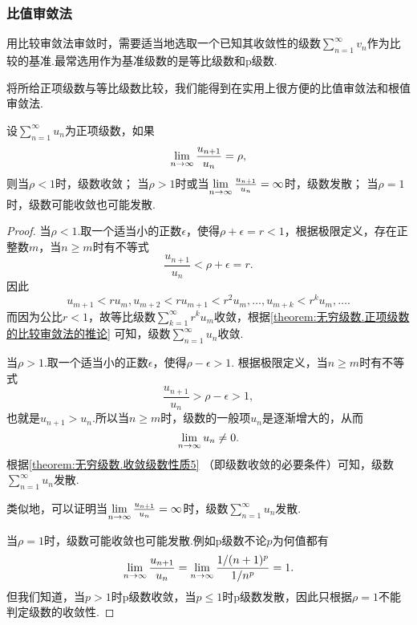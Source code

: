 \subsubsection{比值审敛法}
用比较审敛法审敛时，需要适当地选取一个已知其收敛性的级数\(\sum\limits_{n=1}^\infty v_n\)作为比较的基准.最常选用作为基准级数的是等比级数和p级数.

将所给正项级数与等比级数比较，我们能得到在实用上很方便的比值审敛法和根值审敛法.
\begin{theorem}\label{theorem:无穷级数.正项级数的比值审敛法}
设\(\sum\limits_{n=1}^\infty u_n\)为正项级数，如果\[
\lim\limits_{n\to\infty} \frac{u_{n+1}}{u_n}=\rho,
\]则当\(\rho<1\)时，级数收敛；
当\(\rho>1\)时或当\(\lim\limits_{n\to\infty} \frac{u_{n+1}}{u_n}=\infty\)时，级数发散；
当\(\rho=1\)时，级数可能收敛也可能发散.
\begin{proof}
当\(\rho<1\).取一个适当小的正数\(\epsilon\)，使得\(\rho+\epsilon=r<1\)，根据极限定义，存在正整数\(m\)，当\(n \geq m\)时有不等式\[
\frac{u_{n+1}}{u_n} < \rho + \epsilon = r.
\]因此\[
u_{m+1} < r u_m,
u_{m+2} < r u_{m+1} < r^2 u_m,
\dotsc,
u_{m+k} < r^k u_m,
\dotsc.
\]而因为公比\(r<1\)，故等比级数\(\sum\limits_{k=1}^\infty r^k u_m\)收敛，根据\cref{theorem:无穷级数.正项级数的比较审敛法的推论} 可知，级数\(\sum\limits_{n=1}^\infty u_n\)收敛.

当\(\rho>1\).取一个适当小的正数\(\epsilon\)，使得\(\rho-\epsilon>1\).
根据极限定义，当\(n \geq m\)时有不等式\[
\frac{u_{n+1}}{u_n} > \rho-\epsilon > 1,
\]也就是\(u_{n+1}>u_n\).所以当\(n \geq m\)时，级数的一般项\(u_n\)是逐渐增大的，从而\[
\lim\limits_{n\to\infty} u_n \neq 0.
\]根据\cref{theorem:无穷级数.收敛级数性质5} （即级数收敛的必要条件）可知，级数\(\sum\limits_{n=1}^\infty u_n\)发散.

类似地，可以证明当\(\lim\limits_{n\to\infty} \frac{u_{n+1}}{u_n} = \infty\)时，级数\(\sum\limits_{n=1}^\infty u_n\)发散.

当\(\rho = 1\)时，级数可能收敛也可能发散.例如p级数不论\(p\)为何值都有\[
\lim\limits_{n\to\infty} \frac{u_{n+1}}{u_n} = \lim\limits_{n\to\infty} \frac{1/(n+1)^p}{1/n^p} = 1.
\]但我们知道，当\(p>1\)时p级数收敛，当\(p\leq1\)时p级数发散，因此只根据\(\rho=1\)不能判定级数的收敛性.
\end{proof}
\end{theorem}

